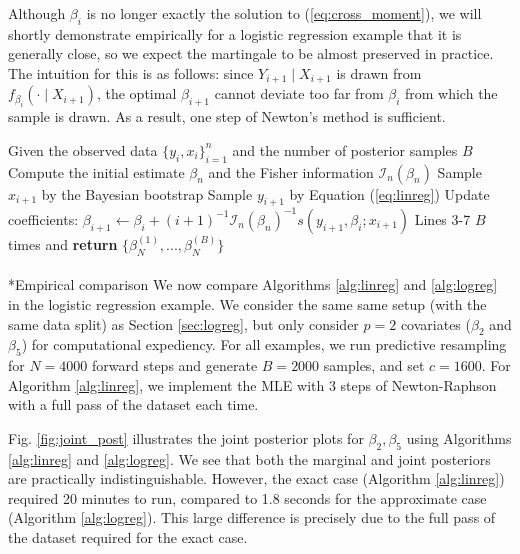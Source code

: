 \documentclass[11pt,a4paper]{article}
\makeatletter
\let\oldparagraph\paragraph
\renewcommand{\paragraph}{
    \@ifstar
      \xxxParagraphStar
      \xxxParagraphNoStar
  }
\newcommand{\xxxParagraphStar}[1]{\oldparagraph*{#1}\mbox{}}
\newcommand{\xxxParagraphNoStar}[1]{\oldparagraph{#1}\mbox{}}
\theoremstyle{plain}
\theoremstyle{remark}
\theoremstyle{remark}
\makeatother
\begin{document}
Although $\beta_i$ is no longer exactly the solution to (\ref{eq:cross_moment}), we will shortly demonstrate empirically for a logistic regression example that it is generally close, so we expect the martingale to be almost preserved in practice. The intuition for this is as follows: since $Y_{i+1}\mid X_{i+1}$ is drawn from $f_{\beta_i}(\cdot \mid X_{i+1})$, the optimal $\beta_{i+1}$ cannot deviate too far from $\beta_i$ from which the sample is drawn. As a result, one step of Newton's method is sufficient.



\begin{algorithm}[!h]\label{alg:logreg}
\caption{Predictive resampling for logistic regression }\label{alg:logreg}
\begin{algorithmic}[1]
\State Given the observed data $\{y_i, x_i\}_{i=1}^n$ and the number of posterior samples $B$
\State Compute the initial estimate $\beta_n$ and the Fisher information $\mathcal{I}_n(\beta_n)$
        \State  Sample $x_{i+1}$ by the Bayesian bootstrap 
        \State  Sample $y_{i+1}$ by Equation (\ref{eq:linreg}) 
        \State  Update coefficients:
        $\beta_{i+1} \gets \beta_{i} + (i+1)^{-1}\mathcal{I}_n(\beta_n)^{-1}s(y_{i+1}, \beta_{i}; x_{i+1})$
  \EndFor 
   Lines 3-7 $B$ times and \textbf{return} $\{\beta^{(1)}_N,...,\beta^{(B)}_N\}$
\end{algorithmic}
\end{algorithm}\vspace{-2mm}
\paragraph*{Empirical comparison} We now compare Algorithms \ref{alg:linreg} and \ref{alg:logreg} in the logistic regression example. We consider the same same setup (with the same data split) as Section \ref{sec:logreg}, but only consider $p = 2$ covariates ($\beta_2$ and $\beta_5$) for computational expediency. For all examples, we run predictive resampling for $N = 4000$ forward steps and generate $B = 2000$ samples, and set $c = 1600$.
For Algorithm \ref{alg:linreg}, we implement the MLE with 3 steps of Newton-Raphson with a full pass of the dataset each time. 



Fig. \ref{fig:joint_post} illustrates the joint posterior plots  for $\beta_2, \beta_5$ using Algorithms \ref{alg:linreg} and \ref{alg:logreg}. We see that both the marginal and joint posteriors are practically indistinguishable. However, the exact case (Algorithm \ref{alg:linreg}) required 20 minutes to run, compared to 1.8 seconds for the approximate case (Algorithm \ref{alg:logreg}). This large difference is precisely due to the full pass of the dataset required for the exact case.
\end{document}
